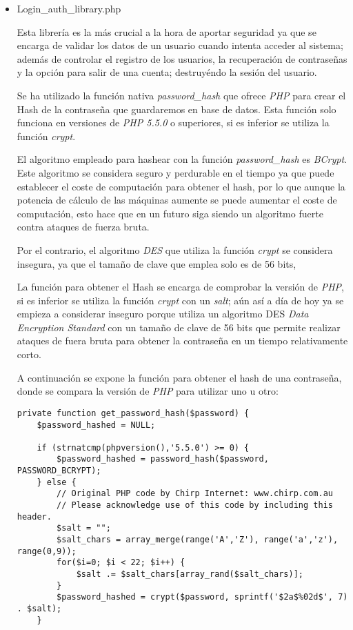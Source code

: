     \begin{itemize}
        \item Login\_auth\_library.php

            Esta librería es la más crucial a la hora de aportar seguridad ya que se encarga de validar los datos de un usuario cuando intenta acceder al sistema; además de controlar el registro de los usuarios, la recuperación de contraseñas y la opción para salir de una cuenta; destruyéndo la sesión del usuario.

            Se ha utilizado la función nativa \emph{password\_hash} que ofrece \emph{PHP} para crear el Hash de la contraseña que guardaremos en base de datos. Esta función solo funciona en versiones de \emph{PHP 5.5.0} o superiores, si es inferior se utiliza la función \emph{crypt}.

            El algoritmo empleado para hashear con la función \emph{password\_hash} es \emph{BCrypt}. Este algoritmo se considera seguro y perdurable en el tiempo ya que puede establecer el coste de computación para obtener el hash, por lo que aunque la potencia de cálculo de las máquinas aumente se puede aumentar el coste de computación, esto hace que en un futuro siga siendo un algoritmo fuerte contra ataques de fuerza bruta.

            Por el contrario, el algoritmo \emph{DES} que utiliza la función \emph{crypt} se considera insegura, ya que el tamaño de clave que emplea solo es de 56 bits,

            La función para obtener el Hash se encarga de comprobar la versión de \emph{PHP}, si es inferior se utiliza la función \emph{crypt} con un \emph{salt}; aún así a día de hoy ya se empieza a considerar inseguro porque utiliza un algoritmo DES \emph{Data Encryption Standard} con un tamaño de clave de 56 bits que permite realizar ataques de fuera bruta para obtener la contraseña en un tiempo relativamente corto.

            A continuación se expone la función para obtener el hash de una contraseña, donde se compara la versión de \emph{PHP} para utilizar uno u otro:

            \begin{lstlisting}
private function get_password_hash($password) {
    $password_hashed = NULL;

    if (strnatcmp(phpversion(),'5.5.0') >= 0) {
        $password_hashed = password_hash($password, PASSWORD_BCRYPT);
    } else {
        // Original PHP code by Chirp Internet: www.chirp.com.au
        // Please acknowledge use of this code by including this header.
        $salt = "";
        $salt_chars = array_merge(range('A','Z'), range('a','z'), range(0,9));
        for($i=0; $i < 22; $i++) {
            $salt .= $salt_chars[array_rand($salt_chars)];
        }
        $password_hashed = crypt($password, sprintf('$2a$%02d$', 7) . $salt);
    }


\end{lstlisting}
\end{itemize}
